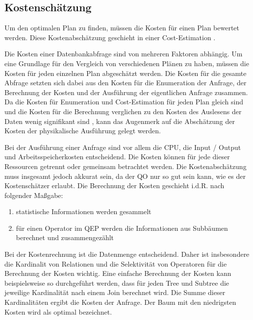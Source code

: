 \subsection{Kostenschätzung}

Um den optimalen Plan zu finden, müssen die Kosten für einen Plan bewertet werden. Diese Kostenabschätzung geschieht in einer Cost-Estimation \cite{bruno2011automated}. 

Die Kosten einer Datenbankabfrage sind von mehreren Faktoren abhängig. Um eine Grundlage für den Vergleich von verschiedenen Plänen zu haben, müssen die Kosten für jeden einzelnen Plan abgeschätzt werden. Die Kosten für die gesamte Abfrage setzten sich dabei aus den Kosten für die Enumeration der Anfrage, der Berechnung der Kosten und der Ausführung der eigentlichen Anfrage zusammen. Da die Kosten für Enumeration und Cost-Estimation für jeden Plan gleich sind und die Kosten für die Berechnung verglichen zu den Kosten des Auslesens der Daten wenig signifikant sind \cite{selinger1979access}, kann das Augenmerk auf die Abschätzung der Kosten der physikalische Ausführung gelegt werden.

Bei der Ausführung einer Anfrage sind vor allem die CPU, die Input / Output und Arbeitsspeicherkosten entscheidend. Die Kosten können für jede dieser Ressourcen getrennt oder gemeinsam betrachtet werden. Die Kostenabschätzung muss insgesamt jedoch akkurat sein, da der \ac{QO} nur so gut sein kann, wie es der Kostenschätzer erlaubt. Die Berechnung der Kosten geschieht i.d.R. nach folgender Maßgabe:

\begin{enumerate}
\item statistische Informationen werden gesammelt
\item für einen Operator im \ac{QEP} werden die Informationen aus Subbäumen berechnet und zusammengezählt
\end{enumerate}

Bei der Kostenrechnung ist die Datenmenge entscheidend. Daher ist insbesondere die Kardinalit von Relationen und die Selektivität von Operatoren für die Berechnung der Kosten
wichtig. Eine einfache Berechnung der Kosten kann beispielsweise so durchgeführt werden, dass für jeden Tree und Subtree die jeweilige Kardinalität nach einem Join berechnet wird. Die Summe dieser Kardinalitäten ergibt die Kosten der Anfrage. Der Baum mit den niedrigsten Kosten wird als optimal bezeichnet.
